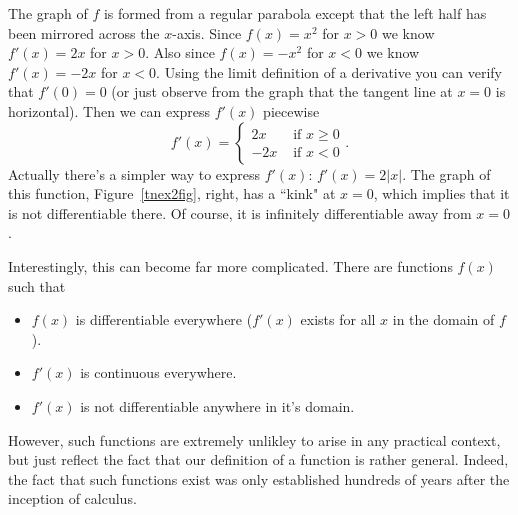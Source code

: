 \begin{bsp}
The graph of $f$ is formed from a regular parabola except that the left half
has been mirrored across the $x$-axis. Since $f(x) = x^2$ for $x>0$ we know
$f'(x) = 2x$ for $x>0$. Also since $f(x) = -x^2$ for $x<0$ we know $f'(x) =
-2x$ for $x<0$. Using the limit definition of a derivative you can verify
that $f'(0) = 0$ (or just observe from the graph that the tangent line at
$x=0$ is horizontal). Then we can express $f'(x)$ piecewise
\[f'(x) = \begin{cases}
2x & \text{ if }x \geq 0 \\
-2x & \text{ if }x < 0
\end{cases}.\]
Actually there's a simpler way to express $f'(x)$: $f'(x) = 2|x|$. The graph
of this function, Figure~\ref{tnex2fig}, right,
has a ``kink" at $x=0$, which implies that it is not differentiable there. 
Of course, it is infinitely differentiable away from $x=0$.
\end{bsp}
Interestingly, this can become far more complicated. There are functions $f(x)$ such that
\begin{itemize}
      \item $f(x)$ is differentiable everywhere ($f'(x)$ exists for all $x$ in the domain of $f$).
      \item $f'(x)$ is continuous everywhere.
      \item $f'(x)$ is not differentiable anywhere in it's domain.
\end{itemize}
However, such functions are extremely unlikley to arise in any practical context,
but just reflect the fact that our definition of a function is rather
general. Indeed, the fact that such functions exist was only established
hundreds of years after the inception of calculus.
